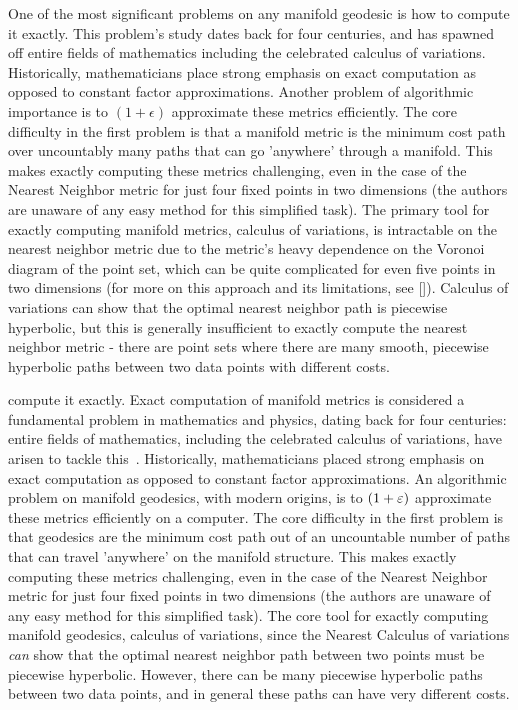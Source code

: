 One of the most significant problems on any manifold geodesic is how to
compute it exactly. This problem's study dates back for four centuries, and
has spawned off entire fields of mathematics including the celebrated
calculus of variations. Historically, mathematicians place strong emphasis
on exact computation as opposed to constant factor approximations.  Another
problem of algorithmic importance is to $(1+\epsilon)$ approximate these
metrics efficiently.  The core difficulty in the first problem is that a
manifold metric is the minimum cost path over uncountably many paths that
can go 'anywhere' through a manifold. This makes exactly computing these
metrics challenging, even in the case of the Nearest Neighbor metric for
just four fixed points in two dimensions (the authors are unaware of any
easy method for this simplified task). The primary tool for exactly
computing manifold metrics, calculus of variations, is intractable on the
nearest neighbor metric due to the metric's heavy dependence on the Voronoi
diagram of the point set, which can be quite complicated for even five
points in two dimensions (for more on this approach and its limitations,
see []). Calculus of variations can show that the optimal nearest neighbor
path is piecewise hyperbolic, but this is generally insufficient to exactly
compute the nearest neighbor metric - there are point sets where there are
many smooth, piecewise hyperbolic paths between two data points with
different costs.


compute it exactly. Exact computation of manifold metrics is considered a
fundamental problem in mathematics and physics, dating back for four
centuries: entire fields of mathematics, including the celebrated calculus
of variations, have arisen to tackle this~\cite{}. Historically,
mathematicians placed strong emphasis on exact computation as opposed to
constant factor approximations. An algorithmic problem on manifold
geodesics, with modern origins, is to $(1+\varepsilon)$ approximate these metrics
efficiently on a computer. The core difficulty in the first problem is that
geodesics are the minimum cost path out of an uncountable number of paths
that can travel 'anywhere' on the manifold structure. This makes exactly
computing these metrics challenging, even in the case of the Nearest
Neighbor metric for just four fixed points in two dimensions (the authors
are unaware of any easy method for this simplified task). The core tool for
exactly computing manifold geodesics, calculus of variations, since the
Nearest Calculus of variations \textit{can} show that the optimal nearest
neighbor path between two points must be piecewise hyperbolic. However,
there can be many piecewise hyperbolic paths between two data points, and
in general these paths can have very different costs. 



